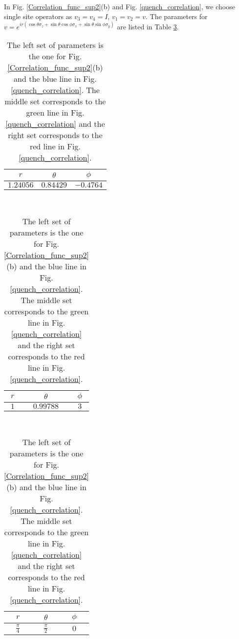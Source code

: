 \documentclass[aps,prx,twocolumn,notitlepage,nofootinbib,nobalancelastpage]{revtex4-2}
\theoremstyle{break}
\newcommand{\1}{\mathbbm{1}}
\theoremstyle{plain}
\theoremstyle{plain}
\theoremstyle{plain}
\begin{document}
In Fig. \ref{Correlation_func_sup2}(b) and Fig. \ref{quench_correlation},
we choose single site operators as $v_{3}=v_{4}=I$, $v_{1}=v_{2}=v$.
The parameters for $v=e^{ir(\cos\theta\sigma_{z}+\sin\theta\cos\phi\sigma_{x}+\sin\theta\sin\phi\sigma_{y})}$ are listed in Table  \ref{tab:my_label}.
\begin{table}[!htbp]
    \centering
\begin{tabular}{|c|c|c|}
\hline 
$r$ & $\theta$ & $\phi$\tabularnewline
\hline 
\hline 
$1.24056$ & $0.84429$ & $-0.4764$\tabularnewline
\hline 
\end{tabular}
\ \ \
\begin{tabular}{|c|c|c|}
\hline 
$r$ & $\theta$ & $\phi$\tabularnewline
\hline 
\hline 
$1$ & $0.99788$ & $\text{3}$\tabularnewline
\hline 
\end{tabular} \ \ \ 
\begin{tabular}{|c|c|c|}
\hline 
$r$ & $\theta$ & $\phi$\tabularnewline
\hline 
\hline 
$\frac{\pi}{4}$ & $\frac{\pi}{2}$ & $0$\tabularnewline
\hline 
\end{tabular}
\caption{The left set of parameters is the one for Fig. \ref{Correlation_func_sup2}(b) and the blue line in Fig. \ref{quench_correlation}. The middle set corresponds to the green line in Fig. \ref{quench_correlation} and the right set corresponds to the red line in Fig. \ref{quench_correlation}.}
\label{tab:my_label}
\end{table}
\end{document}
